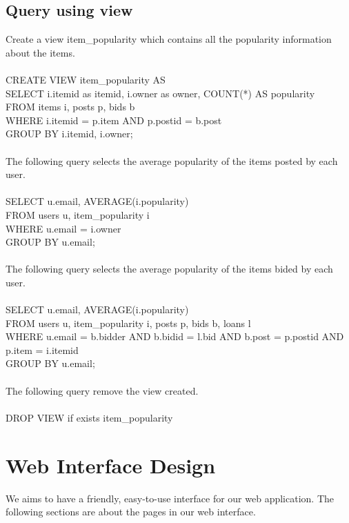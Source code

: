 \subsection{Query using view}
Create a view item\_popularity which contains all the popularity information about the items.\\\\
CREATE VIEW item\_popularity AS\\
SELECT i.itemid as itemid, i.owner as owner, COUNT(*) AS popularity\\
FROM items i, posts p, bids b\\
WHERE i.itemid = p.item AND p.postid = b.post\\
GROUP BY i.itemid, i.owner;\\\\
The following query selects the average popularity of the items posted by each user.\\\\
SELECT u.email, AVERAGE(i.popularity)\\
FROM users u, item\_popularity i\\
WHERE u.email = i.owner\\
GROUP BY u.email;\\\\
The following query selects the average popularity of the items bided by each user.\\\\
SELECT u.email, AVERAGE(i.popularity)\\
FROM users u, item\_popularity i, posts p, bids b, loans l\\
WHERE u.email = b.bidder AND b.bidid = l.bid AND b.post = p.postid AND p.item = i.itemid\\
GROUP BY u.email;\\\\
The following query remove the view created.\\\\
DROP VIEW if exists item\_popularity


\newpage

\section{Web Interface Design}
We aims to have a friendly, easy-to-use interface for our web application. The following sections are about the pages in our web interface.
